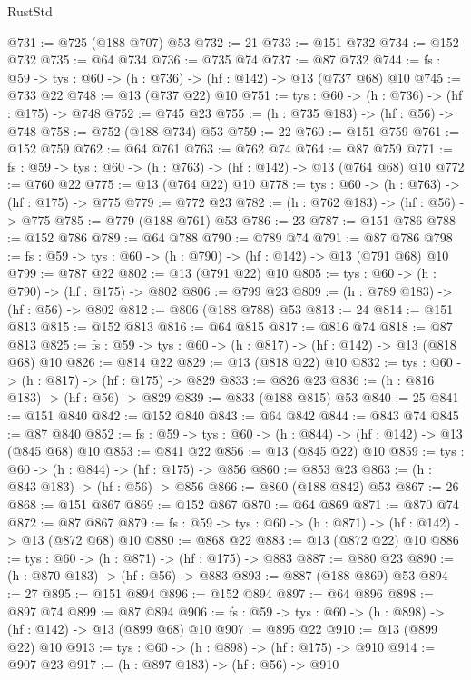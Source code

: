 \begin{lexlean}{RustStd}
\begin{coremodule}
@731 := @725 (@188 @707) @53
@732 := 21
@733 := @151 @732
@734 := @152 @732
@735 := @64 @734
@736 := @735 @74
@737 := @87 @732
@744 := {fs : @59} -> {tys : @60} -> (h : @736) -> (hf : @142) -> @13 (@737 @68) @10
@745 := @733 @22
@748 := @13 (@737 @22) @10
@751 := {tys : @60} -> (h : @736) -> (hf : @175) -> @748
@752 := @745 @23
@755 := (h : @735 @183) -> (hf : @56) -> @748
@758 := @752 (@188 @734) @53
@759 := 22
@760 := @151 @759
@761 := @152 @759
@762 := @64 @761
@763 := @762 @74
@764 := @87 @759
@771 := {fs : @59} -> {tys : @60} -> (h : @763) -> (hf : @142) -> @13 (@764 @68) @10
@772 := @760 @22
@775 := @13 (@764 @22) @10
@778 := {tys : @60} -> (h : @763) -> (hf : @175) -> @775
@779 := @772 @23
@782 := (h : @762 @183) -> (hf : @56) -> @775
@785 := @779 (@188 @761) @53
@786 := 23
@787 := @151 @786
@788 := @152 @786
@789 := @64 @788
@790 := @789 @74
@791 := @87 @786
@798 := {fs : @59} -> {tys : @60} -> (h : @790) -> (hf : @142) -> @13 (@791 @68) @10
@799 := @787 @22
@802 := @13 (@791 @22) @10
@805 := {tys : @60} -> (h : @790) -> (hf : @175) -> @802
@806 := @799 @23
@809 := (h : @789 @183) -> (hf : @56) -> @802
@812 := @806 (@188 @788) @53
@813 := 24
@814 := @151 @813
@815 := @152 @813
@816 := @64 @815
@817 := @816 @74
@818 := @87 @813
@825 := {fs : @59} -> {tys : @60} -> (h : @817) -> (hf : @142) -> @13 (@818 @68) @10
@826 := @814 @22
@829 := @13 (@818 @22) @10
@832 := {tys : @60} -> (h : @817) -> (hf : @175) -> @829
@833 := @826 @23
@836 := (h : @816 @183) -> (hf : @56) -> @829
@839 := @833 (@188 @815) @53
@840 := 25
@841 := @151 @840
@842 := @152 @840
@843 := @64 @842
@844 := @843 @74
@845 := @87 @840
@852 := {fs : @59} -> {tys : @60} -> (h : @844) -> (hf : @142) -> @13 (@845 @68) @10
@853 := @841 @22
@856 := @13 (@845 @22) @10
@859 := {tys : @60} -> (h : @844) -> (hf : @175) -> @856
@860 := @853 @23
@863 := (h : @843 @183) -> (hf : @56) -> @856
@866 := @860 (@188 @842) @53
@867 := 26
@868 := @151 @867
@869 := @152 @867
@870 := @64 @869
@871 := @870 @74
@872 := @87 @867
@879 := {fs : @59} -> {tys : @60} -> (h : @871) -> (hf : @142) -> @13 (@872 @68) @10
@880 := @868 @22
@883 := @13 (@872 @22) @10
@886 := {tys : @60} -> (h : @871) -> (hf : @175) -> @883
@887 := @880 @23
@890 := (h : @870 @183) -> (hf : @56) -> @883
@893 := @887 (@188 @869) @53
@894 := 27
@895 := @151 @894
@896 := @152 @894
@897 := @64 @896
@898 := @897 @74
@899 := @87 @894
@906 := {fs : @59} -> {tys : @60} -> (h : @898) -> (hf : @142) -> @13 (@899 @68) @10
@907 := @895 @22
@910 := @13 (@899 @22) @10
@913 := {tys : @60} -> (h : @898) -> (hf : @175) -> @910
@914 := @907 @23
@917 := (h : @897 @183) -> (hf : @56) -> @910

\end{coremodule}
\end{lexlean}
